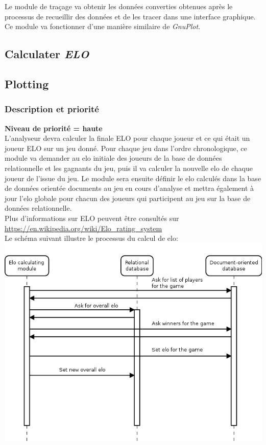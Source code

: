 \documentclass{scrreprt}
\begin{document}
Le module de traçage va obtenir les données converties obtenues après le processus de recueillir des données et de les tracer dans une interface graphique. Ce module va fonctionner d'une manière similaire de \textit{GnuPlot}.

\subsection{Calculater \textit{\textbf{ELO}}}
\subsection{Plotting}
\subsubsection{Description et priorité}
\textbf{Niveau de priorité = haute}\\

L'analyseur devra calculer la finale ELO pour chaque joueur et ce qui était un joueur ELO sur un jeu donné.
Pour chaque jeu dans l'ordre chronologique, ce module va demander au elo initiale des joueurs de la base de données relationnelle et les gagnants du jeu, puis il va calculer la nouvelle elo de chaque joueur de l'issue du jeu. Le module sera ensuite définir le elo calculés dans la base de données orientée documents au jeu en cours d'analyse et mettra également à jour l'elo globale pour chacun des joueurs qui participent au jeu sur la base de données relationnelle.\\

Plus d'informations sur ELO peuvent être consultés sur \url{https://en.wikipedia.org/wiki/Elo_rating_system}\\
Le schéma suivant illustre le processus du calcul de elo:\\
\includegraphics[width=\textwidth,height=\textheight,keepaspectratio]{elocalc}\\
\end{document}
